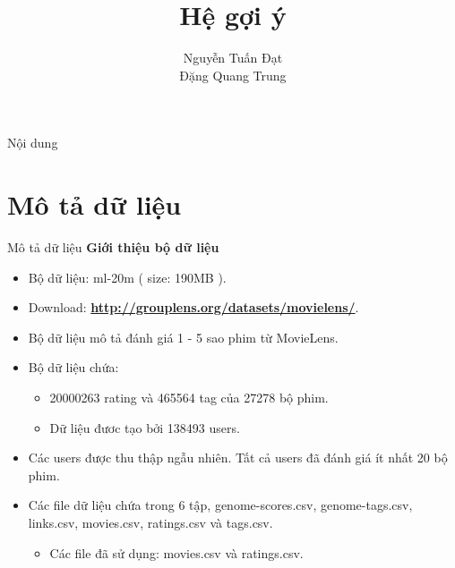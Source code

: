 \documentclass{beamer}
\title[]{{\huge \bf Hệ gợi ý}\\
  }
\author[]{
Nguyễn Tuấn Đạt\\%
Đặng Quang Trung\\
}
\institute[]{
}
\newcommand{\bi}{\begin{itemize}}
\newcommand{\ei}{\end{itemize}}
\begin{document}
\begin{frame}
\titlepage
\end{frame}

\begin{frame}{Nội dung}
\tableofcontents
\end{frame}
\section{Mô tả dữ liệu}
\begin{frame}{Mô tả dữ liệu}
\textbf{Giới thiệu bộ dữ liệu}
\bi
\item Bộ dữ liệu: ml-20m ( size: 190MB ).
\item Download:\textbf{ \url{http://grouplens.org/datasets/movielens/}}.
\item Bộ dữ liệu mô tả đánh giá 1 - 5 sao phim từ MovieLens.
\item Bộ dữ liệu chứa:
\bi
\item 20000263 rating và 465564 tag của 27278 bộ phim.
\item Dữ liệu đươc tạo bởi 138493  users.
\ei
\item Các users được thu thập ngẫu nhiên. Tất cả users đã đánh giá ít nhất 20 bộ phim.
\item Các file dữ liệu chứa trong 6 tập, genome-scores.csv, genome-tags.csv, links.csv, movies.csv, ratings.csv và tags.csv. 
\bi
\item Các file đã sử dụng: movies.csv và ratings.csv.
\ei
\ei
\end{frame}
\end{document}
